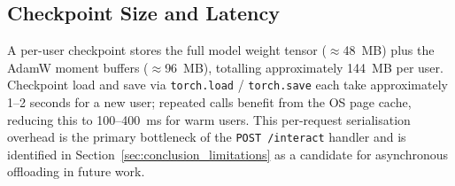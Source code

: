 \subsection{Checkpoint Size and Latency}

A per-user checkpoint stores the full model weight tensor ($\approx$48~MB) plus the AdamW moment buffers ($\approx$96~MB), totalling approximately 144~MB per user.
Checkpoint load and save via \texttt{torch.load} / \texttt{torch.save} each take approximately 1–2 seconds for a new user; repeated calls benefit from the OS page cache, reducing this to 100–400~ms for warm users.
This per-request serialisation overhead is the primary bottleneck of the \texttt{POST /interact} handler and is identified in Section~\ref{sec:conclusion_limitations} as a candidate for asynchronous offloading in future work.
